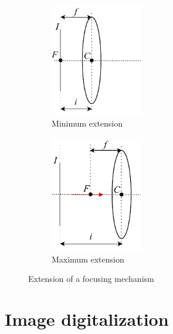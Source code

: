 \begin{description}
            
        \begin{figure}[H]
            \centering
            \begin{subfigure}{0.4\textwidth}
                \centering
                \includegraphics[width=0.45\textwidth]{./img/_focus_mechanism1.pdf}
                \caption{Minimum extension} \label{fig:focus_mechanism_min}
            \end{subfigure}
            \begin{subfigure}{0.4\textwidth}
                \centering
                \includegraphics[width=0.45\textwidth]{./img/_focus_mechanism2.pdf}
                \caption{Maximum extension} \label{fig:focus_mechanism_max}
            \end{subfigure}
            \caption{Extension of a focusing mechanism}
        \end{figure}
\end{description}



\section{Image digitalization}


